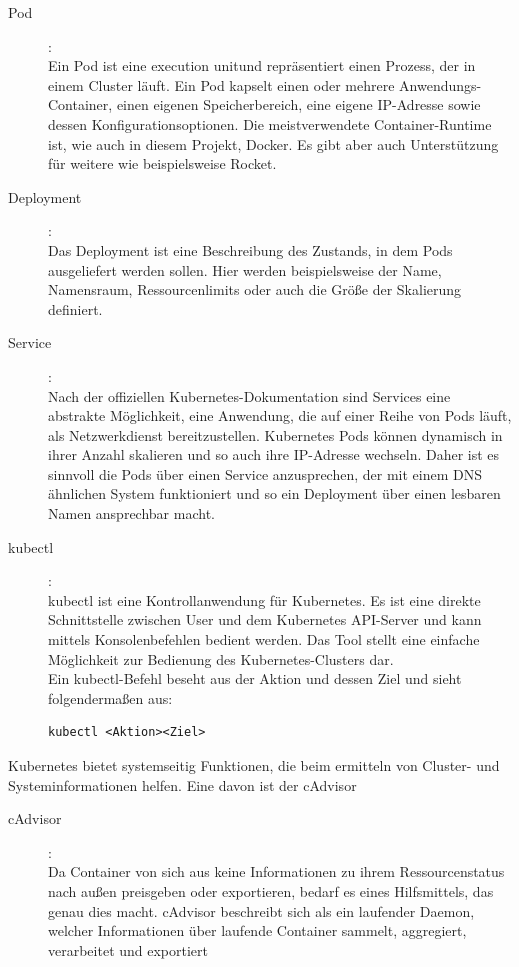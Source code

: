 \documentclass[a4paper,10pt]{scrartcl}
\begin{document}
\begin{description}

\item [Pod]:\\
Ein Pod ist eine \glqq execution unit\grqq und repräsentiert einen Prozess, der in einem Cluster läuft. Ein Pod kapselt einen oder mehrere Anwendungs-Container, einen eigenen Speicherbereich, eine eigene IP-Adresse sowie dessen Konfigurationsoptionen.
Die meistverwendete Container-Runtime ist, wie auch in diesem Projekt, Docker. Es gibt aber auch Unterstützung für weitere wie beispielsweise Rocket.\\
\item [Deployment]:\\
Das Deployment ist eine Beschreibung des Zustands, in dem Pods ausgeliefert werden sollen. Hier werden beispielsweise der Name, Namensraum, Ressourcenlimits oder auch die Größe der Skalierung definiert.
\item [Service]:\\
Nach der offiziellen Kubernetes-Dokumentation sind Services eine \glqq abstrakte Möglichkeit, eine Anwendung, die auf einer Reihe von Pods läuft, als Netzwerkdienst bereitzustellen\grqq. \cite{.30.05.2020b}
Kubernetes Pods können dynamisch in ihrer Anzahl skalieren und so auch ihre IP-Adresse wechseln. Daher ist es sinnvoll die Pods über einen Service anzusprechen, der mit einem DNS ähnlichen System funktioniert und so ein Deployment über einen lesbaren Namen ansprechbar macht. 
\item [kubectl]:\\
kubectl ist eine Kontrollanwendung für Kubernetes. Es ist eine direkte Schnittstelle zwischen User und dem Kubernetes API-Server und kann mittels Konsolenbefehlen bedient werden. Das Tool stellt eine einfache Möglichkeit zur Bedienung des Kubernetes-Clusters dar. \\
Ein kubectl-Befehl beseht aus der Aktion und dessen Ziel und sieht folgendermaßen aus:
\begin{lstlisting}
kubectl <Aktion><Ziel>
\end{lstlisting}

\end{description}

Kubernetes bietet systemseitig Funktionen, die beim ermitteln von Cluster- und Systeminformationen helfen. Eine davon ist der cAdvisor
 
\begin{description} 
\item [cAdvisor]:\\
Da Container von sich aus keine Informationen zu ihrem Ressourcenstatus nach außen preisgeben oder exportieren, bedarf es eines Hilfsmittels, das genau dies macht.
cAdvisor beschreibt sich als \glqq ein laufender Daemon, welcher Informationen über laufende Container sammelt, aggregiert, verarbeitet und exportiert\grqq
\cite{GithubUser:dashpole.05.07.2020}

\end{description}
\end{document}
